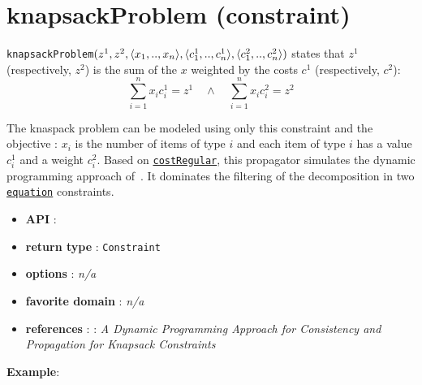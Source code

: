 \section{knapsackProblem (constraint)}\label{knapsackproblem:knapsackproblemconstraint}\hypertarget{knapsackproblem:knapsackproblemconstraint}{}
\begin{notedef}
  \texttt{knapsackProblem}$(z^1, z^2, \langle x_1,..,x_n\rangle, \langle c^1_1,..,c^1_n\rangle, \langle c^2_1,..,c^2_n\rangle)$ states that $z^1$ (respectively, $z^2$) is the sum of the $x$ weighted by the costs $c^1$ (respectively, $c^2$):
$$\sum_{i=1}^{n}x_{i}c^1_{i}=z^1\quad \wedge\quad \sum_{i=1}^{n}x_{i}c^2_{i}=z^2$$
\end{notedef}
The knaspack problem can be modeled using only this constraint and the objective : $x_i$ is the number of items of type $i$ and each item of type $i$ has a value $c^1_i$ and a weight $c^2_i$.
Based on \hyperlink{costregular:costregularconstraint}{\texttt{costRegular}}, this propagator simulates the dynamic programming approach of~\cite{TrickAOR03}.
It dominates the filtering of the decomposition in two \hyperlink{equation}{\texttt{equation}} constraints.

\begin{itemize}
	\item \textbf{API} : 
	\item \textbf{return type} : \texttt{Constraint}
	\item \textbf{options} : \emph{n/a}
	\item \textbf{favorite domain} : \emph{n/a}
	\item \textbf{references} : 
		\cite{TrickAOR03}: \emph{A Dynamic Programming Approach for Consistency and Propagation for Knapsack Constraints}
\end{itemize}

\textbf{Example}:


